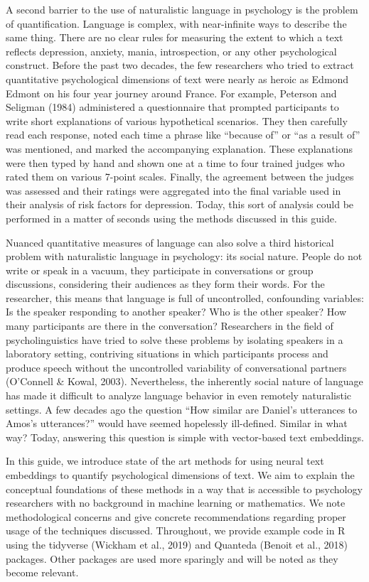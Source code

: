 \documentclass[
  man,
  floatsintext,
  longtable,
  nolmodern,
  notxfonts,
  notimes,
  colorlinks=true,linkcolor=blue,citecolor=blue,urlcolor=blue]{apa7}
\begin{document}
A second barrier to the use of naturalistic language in psychology is
the problem of quantification. Language is complex, with near-infinite
ways to describe the same thing. There are no clear rules for measuring
the extent to which a text reflects depression, anxiety, mania,
introspection, or any other psychological construct. Before the past two
decades, the few researchers who tried to extract quantitative
psychological dimensions of text were nearly as heroic as Edmond Edmont
on his four year journey around France. For example, Peterson and
Seligman (1984) administered a questionnaire that prompted participants
to write short explanations of various hypothetical scenarios. They then
carefully read each response, noted each time a phrase like ``because
of'' or ``as a result of'' was mentioned, and marked the accompanying
explanation. These explanations were then typed by hand and shown one at
a time to four trained judges who rated them on various 7-point scales.
Finally, the agreement between the judges was assessed and their ratings
were aggregated into the final variable used in their analysis of risk
factors for depression. Today, this sort of analysis could be performed
in a matter of seconds using the methods discussed in this guide.

Nuanced quantitative measures of language can also solve a third
historical problem with naturalistic language in psychology: its social
nature. People do not write or speak in a vacuum, they participate in
conversations or group discussions, considering their audiences as they
form their words. For the researcher, this means that language is full
of uncontrolled, confounding variables: Is the speaker responding to
another speaker? Who is the other speaker? How many participants are
there in the conversation? Researchers in the field of psycholinguistics
have tried to solve these problems by isolating speakers in a laboratory
setting, contriving situations in which participants process and produce
speech without the uncontrolled variability of conversational partners
(O'Connell \& Kowal, 2003). Nevertheless, the inherently social nature
of language has made it difficult to analyze language behavior in even
remotely naturalistic settings. A few decades ago the question ``How
similar are Daniel's utterances to Amos's utterances?'' would have
seemed hopelessly ill-defined. Similar in what way? Today, answering
this question is simple with vector-based text embeddings.

In this guide, we introduce state of the art methods for using neural
text embeddings to quantify psychological dimensions of text. We aim to
explain the conceptual foundations of these methods in a way that is
accessible to psychology researchers with no background in machine
learning or mathematics. We note methodological concerns and give
concrete recommendations regarding proper usage of the techniques
discussed. Throughout, we provide example code in R using the tidyverse
(Wickham et al., 2019) and Quanteda (Benoit et al., 2018) packages.
Other packages are used more sparingly and will be noted as they become
relevant.
\end{document}
